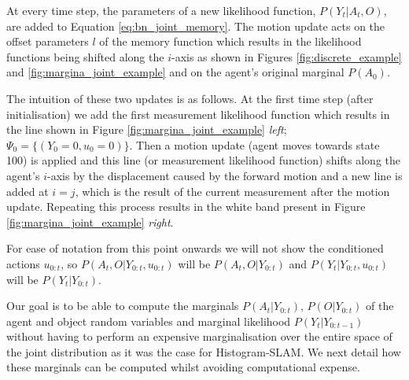 
At every time step, the parameters of a new likelihood function, $P(Y_t|A_t,O)$, are added to Equation \ref{eq:bn_joint_memory}.
The motion update acts on the offset parameters $l$ of the memory function which results in the likelihood functions being shifted
along the $i$-axis as shown in Figures \ref{fig:discrete_example} and \ref{fig:margina_joint_example} and on the agent's original marginal $P(A_0)$.



The intuition of these two updates is as follows. At the first time step (after initialisation) we add the first measurement 
likelihood function which results in the line shown in Figure \ref{fig:margina_joint_example} \textit{left}; $\Psi_0 = \{(Y_0=0,u_0=0)\}$. 
Then a motion update (agent moves towards state 100) is applied and this line (or measurement
likelihood function) shifts along the agent's $i$-axis by the displacement caused by the forward motion and a new line is added at $i=j$, 
which is the result of the current measurement after the motion update. Repeating this process results in the white band present 
in Figure \ref{fig:margina_joint_example} \textit{right}. 

For ease of notation from this point onwards we will not show the conditioned actions $u_{0:t}$, so $P(A_t,O|Y_{0:t},u_{0:t})$ will 
be $P(A_t,O|Y_{0:t})$ and $P(Y_t|Y_{0:t},u_{0:t})$ will be $P(Y_t|Y_{0:t})$.

Our goal is to be able to compute the marginals $P(A_t|Y_{0:t})$, $P(O|Y_{0:t})$ of the agent and object random variables and 
marginal likelihood $P(Y_t|Y_{0:t-1})$ without having to perform an expensive marginalisation over the entire space of the joint distribution as it was the case for Histogram-SLAM.
We next detail how these marginals can be computed whilst avoiding computational expense.

